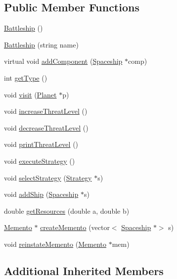 \subsection*{Public Member Functions}
\begin{DoxyCompactItemize}
\item 
\hyperlink{classBattleship_a57a0db9eadfe53049035b3b0e5ec5367}{Battleship} ()
\item 
\hyperlink{classBattleship_afdc3250fb22d1d2dac6f1f71041888c4}{Battleship} (string name)
\item 
virtual void \hyperlink{classBattleship_a698e2d0ef1ffa4e6b5e7b09c0ff7d07c}{add\+Component} (\hyperlink{classSpaceship}{Spaceship} $\ast$comp)
\item 
int \hyperlink{classBattleship_a5fadf030665554b56456467e98c75228}{get\+Type} ()
\item 
void \hyperlink{classBattleship_af89b875b0dadcbf79b6d65d97398e7c1}{visit} (\hyperlink{classPlanet}{Planet} $\ast$p)
\item 
void \hyperlink{classBattleship_a4db634686a840f3348c2a124e5f42d66}{increase\+Threat\+Level} ()
\item 
void \hyperlink{classBattleship_a31ab6421ece477f4de7989b31aa8ed02}{decrease\+Threat\+Level} ()
\item 
void \hyperlink{classBattleship_a41f44a1437e169165b943c3b98316f32}{print\+Threat\+Level} ()
\item 
void \hyperlink{classBattleship_acbb94a57bb20013b07686b750985eb9e}{execute\+Strategy} ()
\item 
void \hyperlink{classBattleship_a2a729de36df2648305cb68c9779c9c2e}{select\+Strategy} (\hyperlink{classStrategy}{Strategy} $\ast$s)
\item 
void \hyperlink{classBattleship_a9167350d564a8f8286841408f0bacdf9}{add\+Ship} (\hyperlink{classSpaceship}{Spaceship} $\ast$s)
\item 
double \hyperlink{classBattleship_a91c6d577c5c761b607b204a9fc59c3ad}{get\+Resources} (double a, double b)
\item 
\hyperlink{classMemento}{Memento} $\ast$ \hyperlink{classBattleship_a0e039fa419a67ff2fec0e65d93f2fefd}{create\+Memento} (vector$<$ \hyperlink{classSpaceship}{Spaceship} $\ast$$>$ s)
\item 
void \hyperlink{classBattleship_a46f7920029ef4968db3a4429f0fb9372}{reinstate\+Memento} (\hyperlink{classMemento}{Memento} $\ast$mem)
\end{DoxyCompactItemize}
\subsection*{Additional Inherited Members}


